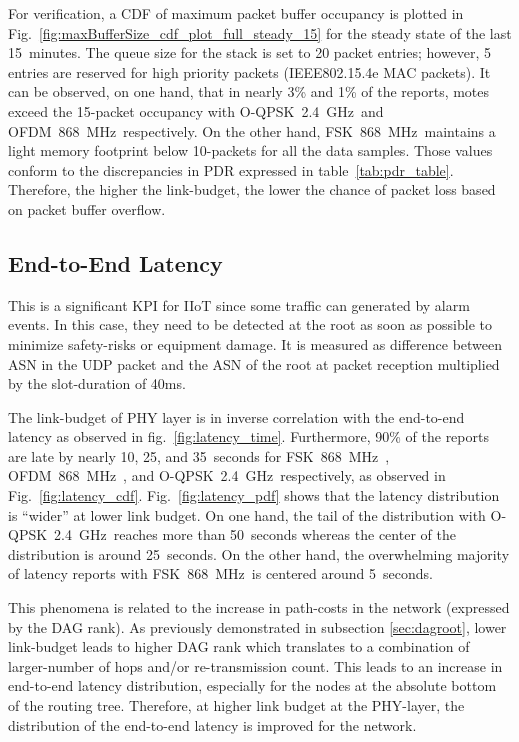 \documentclass[sensors,article,submit,moreauthors,pdftex]{Definitions/mdpi}
\newcommand{\fsk}          {FSK~868~MHz}
\newcommand{\oqpsk}        {O-QPSK~2.4~GHz}
\newcommand{\ofdm}         {OFDM~868~MHz}
\begin{document}

For verification, a CDF of maximum packet buffer occupancy is plotted in Fig.~\ref{fig:maxBufferSize_cdf_plot_full_steady_15} for the steady state of the last 15~minutes. 
The queue size for the stack is set to 20 packet entries; however, 5 entries are reserved for high priority packets (IEEE802.15.4e MAC packets).
It can be observed, on one hand, that in nearly 3\% and 1\% of the reports, motes exceed the 15-packet occupancy with \oqpsk\ and \ofdm\ respectively.
On the other hand, \fsk\ maintains a light memory footprint below 10-packets for all the data samples. 
Those values conform to the discrepancies in PDR expressed in table~\ref{tab:pdr_table}. 
Therefore, the higher the link-budget, the lower the chance of packet loss based on packet buffer overflow. 

\subsection{End-to-End Latency}
\label{sec:latency}


This is a significant KPI for IIoT since some traffic can generated by alarm events.
In this case, they need to be detected at the root as soon as possible to minimize safety-risks or equipment damage.
It is measured as difference between ASN in the UDP packet and the ASN of the root at packet reception multiplied by the slot-duration of 40ms.


The link-budget of PHY layer is in inverse correlation with the end-to-end latency as observed in fig.~\ref{fig:latency_time}.
Furthermore, 90\% of the reports are late by nearly 10, 25, and 35~seconds for \fsk\ , \ofdm\ , and \oqpsk\ respectively, as observed in Fig.~\ref{fig:latency_cdf}.
Fig.~\ref{fig:latency_pdf} shows that the latency distribution is ``wider'' at lower link budget.
On one hand, the tail of the distribution with \oqpsk\  reaches more than 50~seconds whereas the center of the distribution is around 25~seconds.
On the other hand, the overwhelming majority of latency reports with \fsk\ is centered around 5~seconds.


This phenomena is related to the increase in path-costs in the network (expressed by the DAG rank).
As previously demonstrated in subsection \ref{sec:dagroot}, lower link-budget leads to higher DAG rank which translates to a combination of larger-number of hops and/or re-transmission count.
This leads to an increase in end-to-end latency distribution, especially for the nodes at the absolute bottom of the routing tree. 
Therefore, at higher link budget at the PHY-layer, the distribution of the end-to-end latency is improved for the network.
\end{document}
